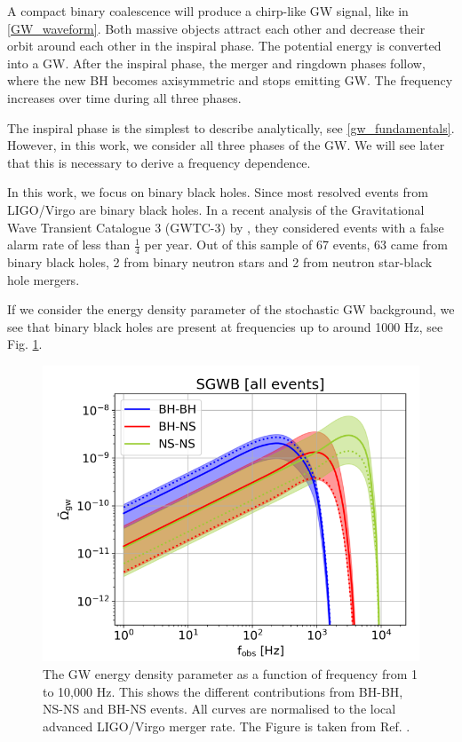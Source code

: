 A compact binary coalescence will produce a chirp-like GW signal, like in \ref{GW_waveform}. Both massive objects attract each other and decrease their orbit around each other in the inspiral phase. The potential energy is converted into a GW. After the inspiral phase, the merger and ringdown phases follow, where the new BH becomes axisymmetric and stops emitting GW. The frequency increases over time during all three phases.

The inspiral phase is the simplest to describe analytically, see \ref{gw_fundamentals}. However, in this work, we consider all three phases of the GW. We will see later that this is necessary to derive a frequency dependence.


In this work, we focus on binary black holes. Since most resolved events from LIGO/Virgo are binary black holes. In a recent analysis of the Gravitational Wave Transient Catalogue 3 (GWTC-3) by \cite{the_ligo_scientific_collaboration_population_2022}, they considered events with a false alarm rate of less than $\frac{1}{4}$ per year. Out of this sample of 67 events, 63 came from binary black holes, 2 from binary neutron stars and 2 from neutron star-black hole mergers.

If we consider the energy density parameter of the stochastic GW background, we see that binary black holes are present at frequencies up to around 1000 Hz, see Fig. \ref{BG_sources}. 

\begin{figure}[h]
    \centering
    \includegraphics[width=0.7\linewidth]{Images/Capurri_GW_Background_monopole_sources.png}
    \caption[The GW energy density parameter as a function of frequency from 1 to 10,000 Hz.]{The GW energy density parameter as a function of frequency from 1 to 10,000 Hz. This shows the different contributions from BH-BH, NS-NS and BH-NS events. All curves are normalised to the local advanced LIGO/Virgo merger rate. The Figure is taken from Ref. \cite{capurri_intensity_2021}.} 
    \label{BG_sources}
\end{figure} 

